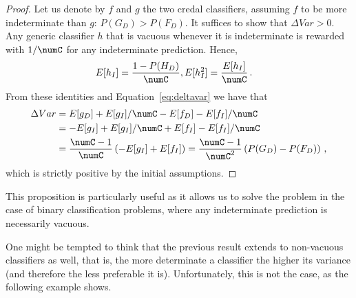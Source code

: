 \documentclass[a4paper,10pt,reqno]{amsart}
\theoremstyle{remark}
\begin{document}
\begin{proof}
  Let us denote by $f$ and $g$ the two credal classifiers, assuming
  $f$ to be more indeterminate than $g$: $P(G_D)>P(F_D)$. It suffices to show
  that $\Delta Var > 0$. Any generic classifier $h$ that is vacuous whenever it is indeterminate is rewarded with $1/\numC$ for any indeterminate prediction. Hence,
 \begin{subequations}
   \begin{align*}
     E[h_I] & = \frac{1-P(H_D)}{\numC},E[h_I^2] = \frac{E[h_I]}{\numC} \, .
  \end{align*}
\end{subequations}
From these identities and Equation~\eqref{eq:deltavar} we have that
\begin{subequations}
\begin{align*}
  \Delta Var & = E[g_D] + E[g_I]/{\numC} - E[f_D] -
  E[f_I]/\numC\\
  & = - E[g_I] + E[g_I]/{\numC} + E[f_I] - E[f_I]/{\numC}\\
  & = \frac{{\numC}-1}{\numC} \left (-E[g_I] + E[f_I] \right ) = \frac{{\numC}-1}{{\numC}^2} \left (P(G_D) - P(F_D) \right )
  \, ,
\end{align*}
\end{subequations}
which is strictly positive by the initial assumptions.
\end{proof}
%
This proposition is particularly useful as it allows us to solve the problem in the case of binary classification problems,
where any indeterminate prediction is necessarily vacuous.

One might be tempted to think that the previous result extends to non-vacuous classifiers as well, that is, the more determinate a classifier the higher its variance (and therefore the less preferable it is). Unfortunately, this is not the case, as the following example shows.
\end{document}
